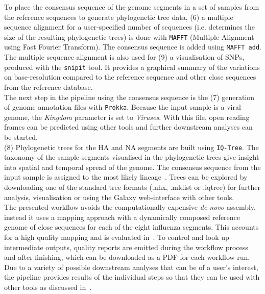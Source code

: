 To place the consensus sequence of the genome segments in a set of samples from the reference sequences to generate phylogenetic tree data, (6) a multiple sequence alignment for a user-specified number of sequences (i.e. determines the size of the resulting phylogenetic trees) is done with \texttt{MAFFT} (Multiple Alignment using Fast Fourier Transform). The consensus sequence is added using \texttt{MAFFT add}. The multiple sequence alignment is also used for (9) a visualisation of SNPs, produced with the \texttt{snipit} tool. It provides a graphical summary of the variations on base-resolution compared to the reference sequence and other close sequences from the reference database. \\
The next step in the pipeline using the consensus sequence is the (7) generation of genome annotation files with \texttt{Prokka}. Because the input sample is a viral genome, the \textit{Kingdom} parameter is set to \textit{Viruses}. With this file, open reading frames can be predicted using other tools and further downstream analyses can be started. \\
(8) Phylogenetic trees for the \ac{HA} and \ac{NA} segments are built using \texttt{IQ-Tree}. The taxonomy of the sample segments visualised in the phylogenetic trees give insight into spatial and temporal spread of the genome. The consensus sequence from the input sample is assigned to the most likely lineage~\cite{minh2020iq}. Trees can be explored by downloading one of the standard tree formats (.nhx, .mldist or .iqtree) for further analysis, visualisation or using the Galaxy web-interface with other tools. \\
The presented workflow avoids the computationally expensive \textit{de novo} assembly, instead it uses a mapping approach with a dynamically composed reference genome of close sequences for each of the eight influenza segments. This accounts for a high quality mapping and is evaluated in~. To control and look up intermediate outputs, quality reports are emitted during the workflow process and after finishing, which can be downloaded as a \ac{PDF} for each workflow run. \\
Due to a variety of possible downstream analyses that can be of a user's interest, the pipeline provides results of the individual steps so that they can be used with other tools as discussed in~.

